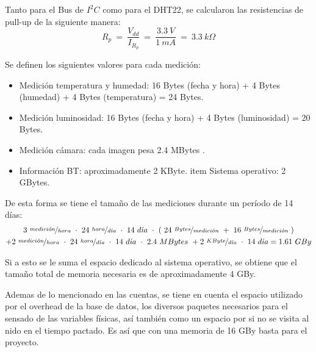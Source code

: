 
Tanto para el Bus de $I^2C$ como para el DHT22, se calcularon las resistencias de pull-up de la siguiente manera:
\begin{equation}
	R_p \ = \  \frac{V_{dd}}{I_{R_p}} \ = \ \frac{3.3 \ V}{1 \ mA} \ = \ 3.3 \ k\Omega  
\end{equation}

Se definen los siguientes valores para cada medici\'on:
\begin{itemize}
	\item Medición temperatura y humedad: 16 Bytes (fecha y hora) + 4 Bytes (humedad) + 4 Bytes (temperatura) = 24 Bytes.
	\item Medición luminosidad: 16 Bytes (fecha y hora) + 4 Bytes (luminosidad) = 20 Bytes.
	\item Medición cámara: cada imagen pesa 2.4 MBytes \cite{ref:rpicam}.
	\item Información BT: aproximadamente 2 KByte.
	item Sistema operativo: 2 GBytes.
\end{itemize}

De esta forma se tiene el tamaño de las mediciones durante un período de 14 días:
\begin{multline*}
	3 \ \nicefrac{medici\acute{o}n}{hora} \  \cdot \ 24 \ \nicefrac{hora}{d\acute{\imath}a} \  \cdot \ 14 \ d\acute{\imath}a \  \cdot \ ( \ 24 \  \nicefrac{Bytes}{medici\acute{o}n} \  + \ 16 \ \nicefrac{Bytes}{medici\acute{o}n} \ ) \\ + 2 \ \nicefrac{medici\acute{o}n}{hora} \  \cdot \ 24 \ \nicefrac{hora}{d\acute{\imath}a} \  \cdot \ 14 \ d\acute{\imath}a \  \cdot \  2.4 \ MBytes \ + 2 \ \nicefrac{KByte}{d\acute{\imath}a} \  \cdot \  14 \ d\acute{\imath}a = 1.61 \ GBy
\end{multline*}

Si a esto se le suma el espacio dedicado al sistema operativo, se obtiene que el tamaño total de memoria necesaria es de aproximadamente 4 GBy.

Ademas de lo mencionado en las cuentas, se tiene en cuenta el espacio utilizado por el overhead de la base de datos, los diversos paquetes necesarios para el sensado de las variables físicas, así también como un espacio por si no se visita al nido en el tiempo pactado. Es así que con una memoria de 16 GBy basta para el proyecto.
